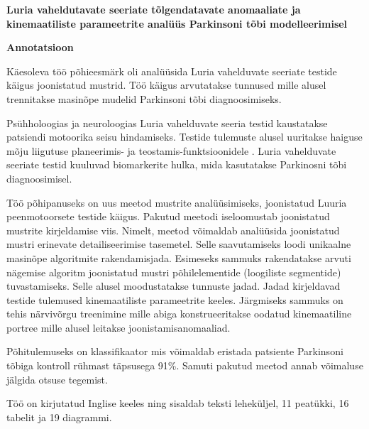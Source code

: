 \begin{titlepage}
\begin{center}
    

{\large \textbf{Luria vaheldutavate seeriate tõlgendatavate anomaaliate ja kinemaatiliste parameetrite analüüs Parkinsoni tõbi  modelleerimisel}}

\vspace*{1cm}

{\Large \textbf{Annotatsioon}}

\vspace*{1cm}
        
\end{center}

Käesoleva töö põhieesmärk oli analüüsida Luria vahelduvate seeriate testide käigus joonistatud mustrid. Töö käigus arvutatakse tunnused mille alusel trennitakse masinõpe mudelid Parkinsoni tõbi diagnoosimiseks.

Psühholoogias ja neuroloogias Luria vahelduvate seeria testid kaustatakse patsiendi motoorika seisu hindamiseks. Testide tulemuste alusel uuritakse haiguse mõju liigutuse planeerimis- ja teostamis-funktsioonidele . Luria vahelduvate seeriate testid kuuluvad biomarkerite hulka, mida kasutatakse  Parkinosni tõbi diagnoosimisel.

Töö põhipanuseks on uus meetod mustrite analüüsimiseks, joonistatud Luuria peenmotoorsete testide käigus. Pakutud meetodi iseloomustab joonistatud mustrite kirjeldamise viis.  Nimelt, meetod võimaldab analüüsida joonistatud mustri erinevate detailiseerimise tasemetel. Selle saavutamiseks  loodi unikaalne masinõpe algoritmite rakendamisjada. Esimeseks sammuks rakendatakse arvuti nägemise algoritm joonistatud mustri põhilelementide (loogiliste segmentide) tuvastamiseks. Selle alusel moodustatakse tunnuste jadad. Jadad kirjeldavad testide tulemused kinemaatiliste parameetrite keeles. Järgmiseks sammuks on tehis närvivõrgu treenimine mille abiga konstrueeritakse oodatud kinemaatiline portree mille alusel leitakse joonistamisanomaaliad.

Põhitulemuseks on klassifikaator mis võimaldab eristada patsiente Parkinsoni tõbiga kontroll rühmast täpsusega 91\%. Samuti pakutud meetod annab võimaluse jälgida otsuse tegemist.   

Töö on kirjutatud Inglise keeles ning sisaldab teksti \pageref{LastPage} leheküljel, 11 peatükki, 16 tabelit ja 19 diagrammi.

\end{titlepage}

